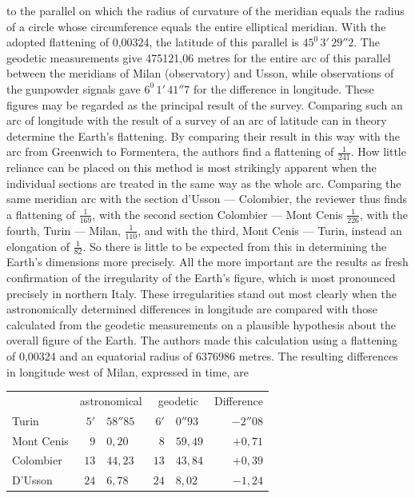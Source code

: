 %
to the parallel on which the radius of curvature of the meridian equals the radius of a circle whose circumference equals the entire elliptical meridian. With the adopted flattening of 0,00324, the latitude of this parallel is \(45^0\,3'\,29''2\). The geodetic measurements give 475121,06 metres for the entire arc of this parallel between the meridians of Milan (observatory) and Usson, while observations of the gunpowder signals gave \(6^0\,1'\,41''7\) for the difference in longitude. These figures may be regarded as the principal result of the survey. Comparing such an arc of longitude with the result of a survey of an arc of latitude can in theory determine the Earth's flattening. By comparing their result in this way with the arc from Greenwich to Formentera, the authors find a flattening of \(\frac{1}{241}\). How little reliance can be placed on this method is most strikingly apparent when the individual sections are treated in the same way as the whole arc. Comparing the same meridian arc with the section d’Usson --- Colombier, the reviewer thus finds a flattening of \(\frac{1}{169}\), with the second section Colombier --- Mont Cenis \(\frac{1}{226}\), with the fourth, Turin --- Milan, \(\frac{1}{110}\), and with the third, Mont Cenis --- Turin, instead an elongation of \(\frac{1}{82}\). So there is little to be expected from this in determining the Earth's dimensions more precisely. All the more important are the results as fresh confirmation of the irregularity of the Earth's figure, which is most pronounced precisely in northern Italy. These irregularities stand out most clearly when the astronomically determined differences in longitude are compared with those calculated from the geodetic measurements on a plausible hypothesis about the overall figure of the Earth. The authors made this calculation using a flattening of 0,00324 and an equatorial radius of 6376986 metres. The resulting differences in longitude west of Milan, expressed in time, are
\begin{center}
\begin{tabular}{l|r@{\quad}l|r@{\quad}l|r}
&\multicolumn{2}{c|}{astronomical}&\multicolumn{2}{c|}{geodetic}&Difference\\
Turin & \(5'\) & \(58''85\) & \(6'\) & \(0''93\) & \(-2''08\)\\
Mont Cenis & \(9\) & \(0,20\) & \(8\) & \(59,49\) & \(+0,71\)\\
Colombier & \(13\) & \(44,23\) & \(13\) & \(43,84\) & \(+0,39\)\\
D’Usson & \(24\) & \(6,78\) & \(24\) & \(8,02\) & \(-1,24\)
\end{tabular}
\end{center}
